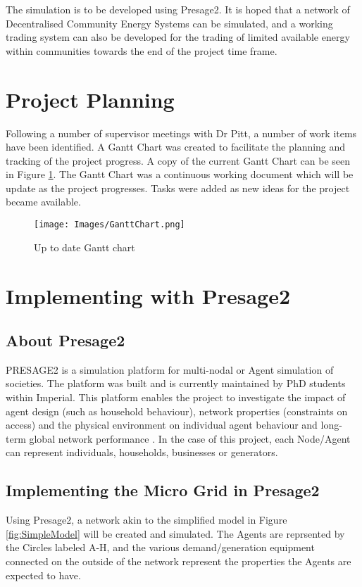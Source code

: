 \documentclass{article}
\begin{document}
The simulation is to be developed using Presage2. It is hoped that a network of Decentralised Community Energy Systems can be simulated, and a working trading system can also be developed for the trading of limited available energy within communities towards the end of the project time frame. 


\section{Project Planning}
Following a number of supervisor meetings with Dr Pitt, a number of work items have been identified. A Gantt Chart was created to facilitate the planning and tracking of the project progress. A copy of the current Gantt Chart can be seen in Figure \ref{fig:GanttChart}. The Gantt Chart was a continuous working document which will be update as the project progresses. Tasks were added as new ideas for the project became available. 

\begin{figure}[h!]
\centering
\texttt{[image: Images/GanttChart.png]}
\caption{Up to date Gantt chart}
\label{fig:GanttChart}
\end{figure}

\clearpage

\section{Implementing with Presage2}
\subsection{About Presage2}
PRESAGE2 is a simulation platform for multi-nodal or Agent simulation of societies. The platform was built and is currently maintained by PhD students within Imperial. This platform enables the project to investigate the impact of agent design (such as household behaviour), network properties (constraints on access) and the physical environment on individual agent behaviour and long-term global network performance \cite{Presage2-Desc:2015}. In the case of this project, each Node/Agent can represent individuals, households, businesses or generators. 

\subsection{Implementing the Micro Grid in Presage2}
Using Presage2, a network akin to the simplified model in Figure \ref{fig:SimpleModel} will be created and simulated. The Agents are reprsented by the Circles labeled A-H, and the various demand/generation equipment connected on the outside of the network represent the properties the Agents are expected to have.
\end{document}
